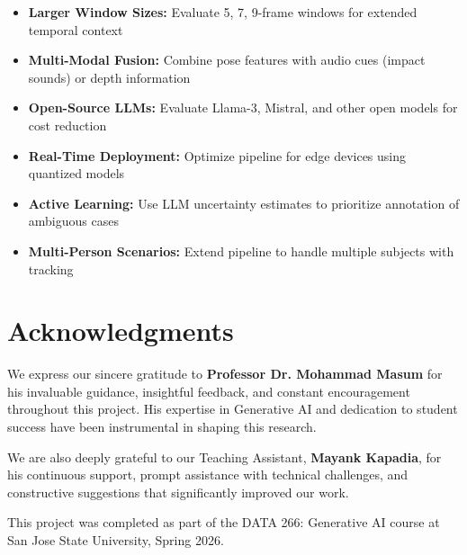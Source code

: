 \documentclass[conference]{IEEEtran}
\begin{document}
\begin{itemize}[leftmargin=*]
    \item \textbf{Larger Window Sizes:} Evaluate 5, 7, 9-frame windows for extended temporal context
    \item \textbf{Multi-Modal Fusion:} Combine pose features with audio cues (impact sounds) or depth information
    \item \textbf{Open-Source LLMs:} Evaluate Llama-3, Mistral, and other open models for cost reduction
    \item \textbf{Real-Time Deployment:} Optimize pipeline for edge devices using quantized models
    \item \textbf{Active Learning:} Use LLM uncertainty estimates to prioritize annotation of ambiguous cases
    \item \textbf{Multi-Person Scenarios:} Extend pipeline to handle multiple subjects with tracking
\end{itemize}

\section*{Acknowledgments}

We express our sincere gratitude to \textbf{Professor Dr. Mohammad Masum} for his invaluable guidance, insightful feedback, and constant encouragement throughout this project. His expertise in Generative AI and dedication to student success have been instrumental in shaping this research.

We are also deeply grateful to our Teaching Assistant, \textbf{Mayank Kapadia}, for his continuous support, prompt assistance with technical challenges, and constructive suggestions that significantly improved our work.

This project was completed as part of the DATA 266: Generative AI course at San Jose State University, Spring 2026.
\end{document}
